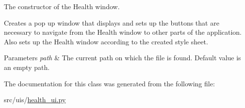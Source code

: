 The constructor of the Health window. 

Creates a pop up window that displays and sets up the buttons that are necessary to navigate from the Health window to other parts of the application. Also sets up the Health window according to the created style sheet. 
\begin{DoxyParams}{Parameters}
{\em path} & The current path on which the file is found. Default value is an empty path. \\
\hline
\end{DoxyParams}


The documentation for this class was generated from the following file\+:\begin{DoxyCompactItemize}
\item 
src/uis/\hyperlink{health__ui_8py}{health\+\_\+ui.\+py}\end{DoxyCompactItemize}
